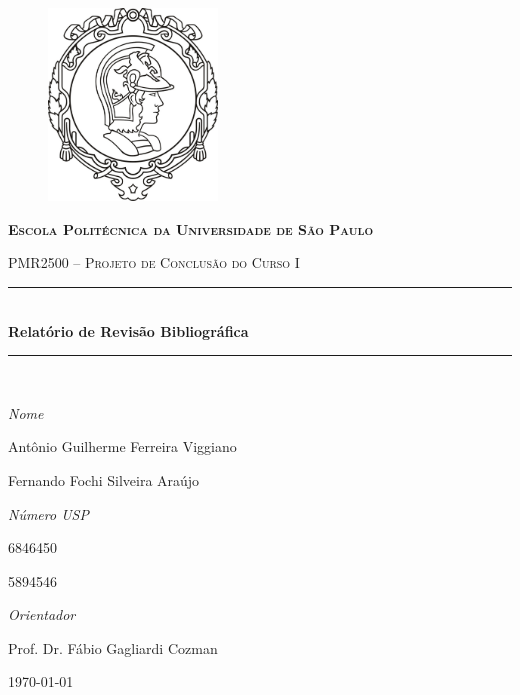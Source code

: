 \begin{titlepage}
\begin{center}
\begin{figure}[ht]
    \begin{center}
    \includegraphics[width=0.4\textwidth]{img/logo_poli}
    \end{center}
    \label{logo_poli}
\end{figure}
\begin{center}
\textbf{\textsc{Escola Politécnica da Universidade de São Paulo}}

\textsc{PMR2500 -- Projeto de Conclusão do Curso I}
\end{center}

\vspace{2cm}
\hrule  ~\\[0.5cm]
{ \huge \bfseries Relatório de Revisão Bibliográfica}\\[0.4cm]

\hrule  ~\\[0.5cm]

\end{center}


\vfill

\begin{minipage}{0.7\textwidth} 
	\large\emph{Nome} 
	
	\large{Antônio Guilherme Ferreira Viggiano}
		
	\large{Fernando Fochi Silveira Araújo}  

\end{minipage}
\begin{minipage}{0.3\textwidth} 
	\large\emph{Número USP}
	
	6846450
	
	5894546
\end{minipage}

\vfill

\begin{center}
	\large\emph{Orientador}

	\large{Prof. Dr. Fábio Gagliardi Cozman}
\end{center}

\vfill

\begin{center}
	\today
\end{center}

\end{titlepage}
